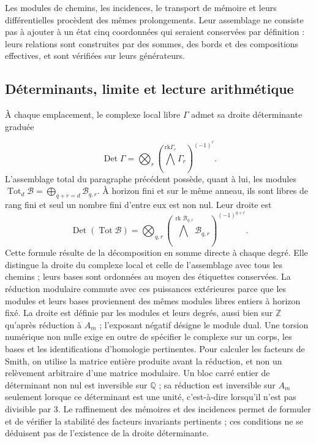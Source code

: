 Les modules de chemins, les incidences, le transport de mémoire et leurs différentielles procèdent des mêmes prolongements. Leur assemblage ne consiste pas à ajouter à un état cinq coordonnées qui seraient conservées par définition : leurs relations sont construites par des sommes, des bords et des compositions effectives, et sont vérifiées sur leurs générateurs.

\subsection{Déterminants, limite et lecture arithmétique}
À chaque emplacement, le complexe local libre \(\Gamma\) admet sa droite déterminante graduée

\[
\operatorname{Det}\Gamma=
\bigotimes_r\left(\bigwedge^{\mathrm{rk}\Gamma_r}\Gamma_r\right)^{(-1)^r}.
\]
L'assemblage total du paragraphe précédent possède, quant à lui, les modules \(\operatorname{Tot}_d\mathcal B=\bigoplus_{q+r=d}\mathcal B_{q,r}\). À horizon fini et sur le même anneau, ils sont libres de rang fini et seul un nombre fini d'entre eux est non nul. Leur droite est
\[
\operatorname{Det}(\operatorname{Tot}\mathcal B)=
\bigotimes_{q,r}
\left(\bigwedge^{\operatorname{rk}\mathcal B_{q,r}}
\mathcal B_{q,r}\right)^{(-1)^{q+r}}.
\]
Cette formule résulte de la décomposition en somme directe à chaque degré. Elle distingue la droite du complexe local et celle de l'assemblage avec tous les chemins ; leurs bases sont ordonnées au moyen des étiquettes conservées. La réduction modulaire commute avec ces puissances extérieures parce que les modules et leurs bases proviennent des mêmes modules libres entiers à horizon fixé.
La droite est définie par les modules et leurs degrés, aussi bien sur \(\mathbb Z\) qu'après réduction à \(A_m\) ; l'exposant négatif désigne le module dual. Une torsion numérique non nulle exige en outre de spécifier le complexe sur un corps, les bases et les identifications d'homologie pertinentes. Pour calculer les facteurs de Smith, on utilise la matrice entière produite avant la réduction, et non un relèvement arbitraire d'une matrice modulaire. Un bloc carré entier de déterminant non nul est inversible sur \(\mathbb Q\) ; sa réduction est inversible sur \(A_m\) seulement lorsque ce déterminant est une unité, c'est-à-dire lorsqu'il n'est pas divisible par \(3\). Le raffinement des mémoires et des incidences permet de formuler et de vérifier la stabilité des facteurs invariants pertinents ; ces conditions ne se déduisent pas de l'existence de la droite déterminante.


